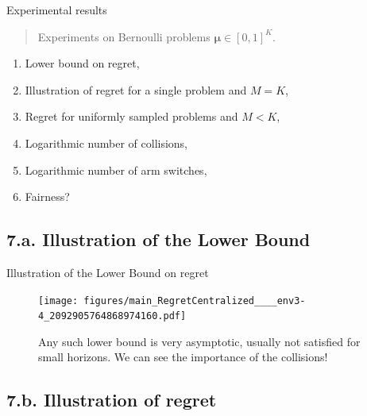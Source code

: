 \documentclass[12pt,english,ignorenonframetext,aspectratio=169,]{beamer}
\providecommand{\tightlist}{%
  \setlength{\itemsep}{0pt}\setlength{\parskip}{0pt}}
\begin{document}
\begin{frame}{Experimental results}

\begin{quote}
Experiments on Bernoulli problems \(\boldsymbol{\mu}\in[0,1]^K\).
\end{quote}

\begin{enumerate}
\def\labelenumi{\arabic{enumi}.}
\tightlist
\item
  Lower bound on regret,\vspace*{15pt}
\item
  Illustration of regret for a single problem and
  \(M = K\),\vspace*{15pt}
\item
  Regret for uniformly sampled problems and \(M < K\),\vspace*{15pt}
\item
  Logarithmic number of collisions,\vspace*{15pt}
\item
  Logarithmic number of arm switches,\vspace*{15pt}
\item
  Fairness?
\end{enumerate}

\end{frame}


\subsection{\hfill{}7.a. Illustration of the Lower Bound\hfill{}}

\begin{frame}[plain]{Illustration of the Lower Bound on regret}

\begin{figure}[h!]
\texttt{[image: figures/main\_RegretCentralized\_\_\_\_env3-4\_2092905764868974160.pdf]}
\caption{\footnotesize{Any such lower bound is \alert{very asymptotic}, usually not satisfied for small horizons. We can see the importance of the collisions!}}
\end{figure}

\end{frame}



\subsection{\hfill{}7.b. Illustration of regret\hfill{}}
\end{document}
